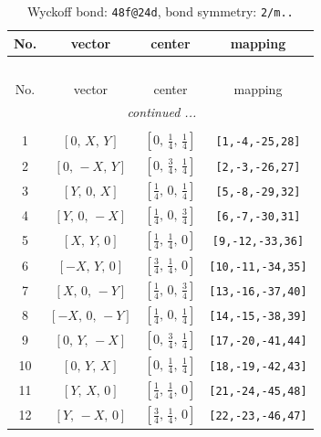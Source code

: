 \documentclass[fleqn,8pt]{jsarticle}
\begin{document}
\renewcommand{\arraystretch}{1.2}
\begin{longtable}{cccc}
\caption{Wyckoff bond: {\tt 48f@24d}, bond symmetry: {\tt 2/m..}}
 \\
 \hline \hline
No. & vector & center & mapping \\ \hline \endfirsthead

\multicolumn{3}{l}{\tablename\ \thetable{}} \\
 \hline \hline
No. & vector & center & mapping \\ \hline \endhead

 \hline \hline
\multicolumn{3}{r}{\footnotesize\it continued ...} \\ \endfoot

 \hline \hline
\multicolumn{3}{r}{} \\ \endlastfoot

1 & $\left[ 0,\, X,\, Y \right]$ & $\left[ 0,\, \frac{1}{4},\, \frac{1}{4} \right]$ & {\tt [1,-4,-25,28]} \\ \hline
2 & $\left[ 0,\, - X,\, Y \right]$ & $\left[ 0,\, \frac{3}{4},\, \frac{1}{4} \right]$ & {\tt [2,-3,-26,27]} \\ \hline
3 & $\left[ Y,\, 0,\, X \right]$ & $\left[ \frac{1}{4},\, 0,\, \frac{1}{4} \right]$ & {\tt [5,-8,-29,32]} \\ \hline
4 & $\left[ Y,\, 0,\, - X \right]$ & $\left[ \frac{1}{4},\, 0,\, \frac{3}{4} \right]$ & {\tt [6,-7,-30,31]} \\ \hline
5 & $\left[ X,\, Y,\, 0 \right]$ & $\left[ \frac{1}{4},\, \frac{1}{4},\, 0 \right]$ & {\tt [9,-12,-33,36]} \\ \hline
6 & $\left[ - X,\, Y,\, 0 \right]$ & $\left[ \frac{3}{4},\, \frac{1}{4},\, 0 \right]$ & {\tt [10,-11,-34,35]} \\ \hline
7 & $\left[ X,\, 0,\, - Y \right]$ & $\left[ \frac{1}{4},\, 0,\, \frac{3}{4} \right]$ & {\tt [13,-16,-37,40]} \\ \hline
8 & $\left[ - X,\, 0,\, - Y \right]$ & $\left[ \frac{1}{4},\, 0,\, \frac{1}{4} \right]$ & {\tt [14,-15,-38,39]} \\ \hline
9 & $\left[ 0,\, Y,\, - X \right]$ & $\left[ 0,\, \frac{3}{4},\, \frac{1}{4} \right]$ & {\tt [17,-20,-41,44]} \\ \hline
10 & $\left[ 0,\, Y,\, X \right]$ & $\left[ 0,\, \frac{1}{4},\, \frac{1}{4} \right]$ & {\tt [18,-19,-42,43]} \\ \hline
11 & $\left[ Y,\, X,\, 0 \right]$ & $\left[ \frac{1}{4},\, \frac{1}{4},\, 0 \right]$ & {\tt [21,-24,-45,48]} \\ \hline
12 & $\left[ Y,\, - X,\, 0 \right]$ & $\left[ \frac{3}{4},\, \frac{1}{4},\, 0 \right]$ & {\tt [22,-23,-46,47]} \\
\end{longtable}
\end{document}
